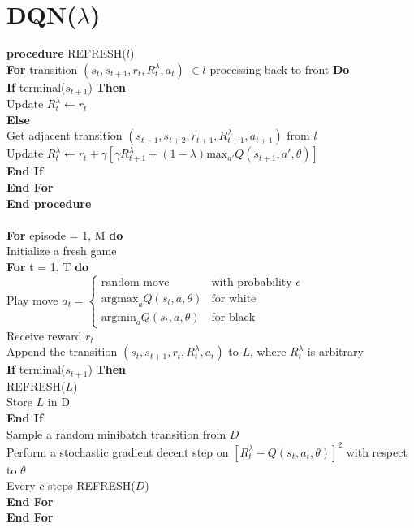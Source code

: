 \documentclass{article}
\begin{document}
\pagebreak


\section{DQN($\lambda$)}
\textbf{procedure} REFRESH($l$) \\
\indent \textbf{For} transition $(s_t, s_{t+1}, r_t, R_t^\lambda, a_t)$ $\in l$ processing back-to-front \textbf{Do} \\
\indent \indent \textbf{If} terminal($s_{t+1}$) \textbf{Then} \\
\indent \indent \indent Update $R_t^\lambda \leftarrow r_t$ \\
\indent \indent \textbf{Else} \\
\indent \indent \indent Get adjacent transition $(s_{t+1}, s_{t+2}, r_{t+1}, R_{t+1}^\lambda, a_{t+1})$ from $l$ \\
\indent \indent \indent Update $R_t^\lambda \leftarrow r_t + \gamma [\gamma R_{t+1}^\lambda + (1 - \lambda) \text{max}_{a'}Q(s_{t+1}, a', \theta)]$ \\
\indent \indent \textbf{End If} \\
\indent \textbf{End For} \\
\textbf{End procedure} \\
\\
\textbf{For} episode = 1, M \textbf{do} \\
\indent Initialize a fresh game \\
\indent \textbf {For} t = 1, T \textbf{do} \\
\indent \indent Play move
$
a_t= 
\begin{cases}
\text{random move} 									& \text{with probability } \epsilon \\
\text{argmax}_a Q(s_t, a, \theta)     & \text{for white} \\
\text{argmin}_a Q(s_t, a, \theta)     & \text{for black}
\end{cases}
$ \\
\indent \indent Receive reward $r_t$  \\
\indent \indent Append the transition $(s_t, s_{t+1}, r_t,  R_t^\lambda, a_t)$ to $L$, where $R_t^\lambda$ is arbitrary\\
\indent \indent \textbf{If} terminal($s_{t+1}$) \textbf{Then} \\
\indent \indent \indent REFRESH($L$) \\
\indent \indent \indent Store $L$ in D \\
\indent \indent \textbf{End If} \\
\indent \indent Sample a random minibatch transition from $D$  \\
\indent \indent Perform a stochastic gradient decent step on $[R_t^\lambda - Q(s_t, a_t, \theta)]^2$ with respect to $\theta$  \\
\indent \indent Every $c$ steps REFRESH($D$)   \\
\indent  \textbf{End For}  \\
\textbf{End For} \\
\end{document}
